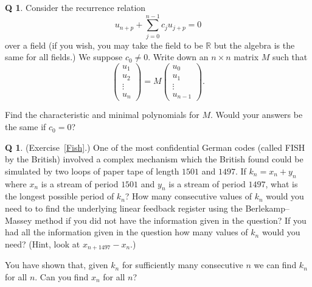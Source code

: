 \documentclass[12pt,a4paper]{article}
\theoremstyle{plain}
\theoremstyle{definition}
\newtheorem{question}[theorem]{Q}
\begin{document}
\begin{question}\label{C4.5} 
Consider the recurrence relation
\[u_{n+p}+\sum_{j=0}^{n-1}c_{j}u_{j+p}=0\]
over a field (if you wish, you may take the field 
to be ${\mathbb R}$
but the algebra is the same for all fields.)
We suppose $c_{0}\neq 0$. 
Write down an $n\times n$
matrix $M$ such that 
\[\left(\begin{matrix}
u_{1}\\u_{2}\\ \vdots\\u_{n}
\end{matrix}\right)
=M\left(\begin{matrix}
u_{0}\\u_{1}\\ \vdots\\u_{n-1}
\end{matrix}\right).\]

Find the characteristic and minimal polynomials for $M$.
Would your answers be the same if $c_{0}=0$?
\end{question} 
\begin{question}\label{C4.6}
(Exercise~\ref{Fish}.)
One of the most confidential
German codes (called FISH by the British)
involved a complex mechanism which
the British found could be simulated
by two loops of paper tape of
length $1501$ and $1497$. If $k_{n}=x_{n}+y_{n}$
where $x_{n}$ is a stream of period $1501$
and $y_{n}$ is a stream of period $1497$,
what is the longest possible period of $k_{n}$?
How many consecutive values of $k_{n}$ would you
need to to find the underlying linear feedback register
using the Berlekamp--Massey method if you did
not have the information given in the question?
If you had
all the information given in the question
how many values of $k_{n}$ would you need?
(Hint, look at $x_{n+1497}-x_{n}$.)

You have shown that, given $k_{n}$ for sufficiently
many consecutive $n$ we can find $k_{n}$ for all $n$.
Can you find $x_{n}$ for all $n$? 
\end{question} 
\end{document}
